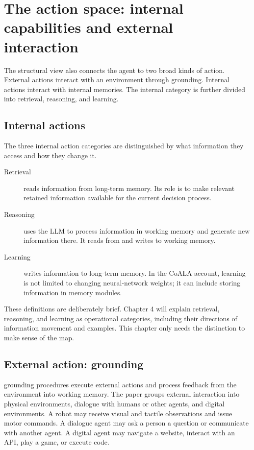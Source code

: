 \section{The action space: internal capabilities and external interaction}

The structural view also connects the agent to two broad kinds of action. External actions interact with an environment through grounding. Internal actions interact with internal memories. The internal category is further divided into retrieval, reasoning, and learning.

\subsection{Internal actions}

The three internal action categories are distinguished by what information they access and how they change it.

\begin{description}
  \item[Retrieval] reads information from long-term memory. Its role is to make relevant retained information available for the current decision process.
  \item[Reasoning] uses the LLM to process information in working memory and generate new information there. It reads from and writes to working memory.
  \item[Learning] writes information to long-term memory. In the CoALA account, learning is not limited to changing neural-network weights; it can include storing information in memory modules.
\end{description}

These definitions are deliberately brief. Chapter 4 will explain retrieval, reasoning, and learning as operational categories, including their directions of information movement and examples. This chapter only needs the distinction to make sense of the map.

\subsection{External action: grounding}

\Gls{grounding} procedures execute external actions and process feedback from the environment into working memory. The paper groups external interaction into physical environments, dialogue with humans or other agents, and digital environments. A robot may receive visual and tactile observations and issue motor commands. A dialogue agent may ask a person a question or communicate with another agent. A digital agent may navigate a website, interact with an API, play a game, or execute code.

